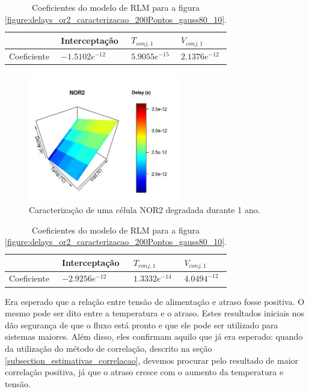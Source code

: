 \begin{table}[H]
	\centering
	\caption{Coeficientes do modelo de RLM para a figura \ref{figure:delays_or2_caracterizacao_200Pontos_gauss80_10}.}
	\begin{tabular}{@{}l|l|l|l@{}}
		\toprule
		& Interceptação & $T_{conj,1}$ & $V_{conj,1}$ \\ \midrule
		Coeficiente & $-1.5102e^{-12}$ & $5.9055e^{-15}$ & $2.1376e^{-12}$ \\ \bottomrule
	\end{tabular}
	\label{tb:regressao_multipla_OR2}
\end{table}
\begin{figure}[H]
	\center
	\includegraphics[width=0.6\textwidth]{images/delays_nor2_caracterizacao_200Pontos_gauss80_10}
	\caption{Caracterização de uma célula NOR2 degradada durante 1 ano.}
	\label{figure:delays_nor2_caracterizacao_200Pontos_gauss80_10}	
\end{figure}
\begin{table}[H]
	\centering
	\caption{Coeficientes do modelo de RLM para a figura \ref{figure:delays_or2_caracterizacao_200Pontos_gauss80_10}.}
	\begin{tabular}{@{}l|l|l|l@{}}
		\toprule
		& Interceptação & $T_{conj,1}$ & $V_{conj,1}$ \\ \midrule
		Coeficiente & $-2.9256e^{-12}$ & $1.3332e^{-14}$ & $4.0494^{-12}$ \\ \bottomrule
	\end{tabular}
	\label{tb:regressao_multipla_OR2}
\end{table}

Era esperado que a relação entre tensão de alimentação e atraso fosse positiva. O mesmo pode ser dito entre a temperatura e o atraso. Estes resultados iniciais nos dão segurança de que o fluxo está pronto e que ele pode ser utilizado para sistemas maiores. Além disso, eles confirmam aquilo que já era esperado: quando da utilização do método de correlação, descrito na seção \ref{subsection_estimativas_correlacao}, devemos procurar pelo resultado de maior correlação positiva, já que o atraso cresce com o aumento da temperatura e tensão.
